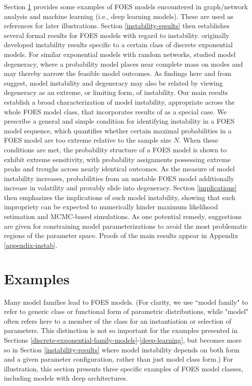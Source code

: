 \documentclass[numbib]{imamat}
\theoremstyle{theorem}
\theoremstyle{lemma}
\theoremstyle{example}
\theoremstyle{corollary}
\theoremstyle{definition}
\theoremstyle{remark}
\theoremstyle{approximation}
\theoremstyle{scheme}
\newcommand{\ak}[1]{{\color{blue} #1}}
\begin{document}
Section \ref{examples} provides some examples of FOES models encountered in graph/network analysis and machine learning (i.e., deep learning models). These are used as references for later illustrations. Section \ref{instability-results} then establishes several formal results for FOES models with regard to instability. \citet{schweinberger2011instability} originally developed instability results specific to a certain class of discrete exponential models. For similar exponential models with random networks, \citet{handcock2003assessing} studied model degeneracy, where a probability model places near complete mass on modes and may thereby narrow the feasible model outcomes. As findings here and from \citet{schweinberger2011instability} suggest, model instability and degeneracy may also be related by viewing degeneracy as an extreme, or limiting form, of instability. Our main results establish a broad characterization of model instability, appropriate across the whole FOES model class, that incorporates results of \citet{schweinberger2011instability} as a special case. We prescribe a general and simple condition for identifying instability in a FOES model sequence, which quantifies whether certain maximal probabilities in a FOES model are too extreme relative to the sample size \(N\). When these conditions are met, the probability structure of a FOES model is shown to exhibit extreme sensitivity, with probability assignments possessing extreme peaks and troughs across nearly identical outcomes. As the measure of model instability increases, probabilities from an unstable FOES model additionally increase in volatility and provably slide into degeneracy. Section \ref{implications} then emphasizes the implications of such model instability, showing that such impropriety can be expected to numerically hinder maximum likelihood estimation and MCMC-based simulations. As one potential remedy, suggestions are given for constraining model parameterizations to avoid the most problematic regions of the parameter space. Proofs of the main results appear in Appendix \ref{appendix-instab}.

\hypertarget{examples}{%
\section{Examples}\label{examples}}

Many model families \ak{lead to} FOES models. \ak{(For clarity, we use ``model family" to refer to generic class or functional form of parametric distributions, while "model" often refers here to a member of the class for an instantiation or selection of parameters. This distinction is not so important for the examples presented in Sections \ref{discrete-exponential-family-models}-\ref{deep-learning}, but becomes more so in Section \ref{instability-results} where model instability depends on both form and a given parameter configuration, rather than just model class form.)} For illustration, this section presents three specific examples of FOES model \ak{classes}, including models with deep architectures.
\end{document}
